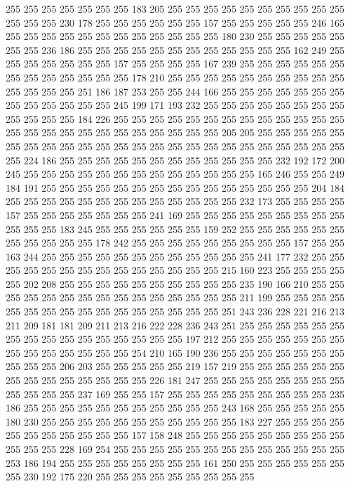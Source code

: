 255 255 255 255 255 255 255 183 205 255 255 255 255 255 255 255 255 255 255 255
255 255 230 178 255 255 255 255 255 255 157 255 255 255 255 255 246 165 255 255
255 255 255 255 255 255 255 255 255 255 180 230 255 255 255 255 255 255 255 236
186 255 255 255 255 255 255 255 255 255 255 255 255 162 249 255 255 255 255 255
255 255 157 255 255 255 255 167 239 255 255 255 255 255 255 255 255 255 255 255
255 255 178 210 255 255 255 255 255 255 255 255 255 255 255 255 255 255 251 186
187 253 255 255 244 166 255 255 255 255 255 255 255 255 255 255 255 255 255 245
199 171 193 232 255 255 255 255 255 255 255 255 255 255 255 255 184 226 255 255
255 255 255 255 255 255 255 255 255 255 255 255 255 255 255 255 255 255 255 255
255 255 255 205 205 255 255 255 255 255 255 255 255 255 255 255 255 255 255 255
255 255 255 255 255 255 255 255 255 255 224 186 255 255 255 255 255 255 255 255
255 255 255 255 232 192 172 200 245 255 255 255 255 255 255 255 255 255 255 255
255 255 165 246 255 255 249 184 191 255 255 255 255 255 255 255 255 255 255 255
255 255 255 255 204 184 255 255 255 255 255 255 255 255 255 255 255 255 255 232
173 255 255 255 255 157 255 255 255 255 255 255 255 241 169 255 255 255 255 255
255 255 255 255 255 255 255 183 245 255 255 255 255 255 255 159 252 255 255 255
255 255 255 255 255 255 255 255 178 242 255 255 255 255 255 255 255 255 255 157
255 255 163 244 255 255 255 255 255 255 255 255 255 255 255 255 241 177 232 255
255 255 255 255 255 255 255 255 255 255 255 255 255 215 160 223 255 255 255 255
255 202 208 255 255 255 255 255 255 255 255 255 255 235 190 166 210 255 255 255
255 255 255 255 255 255 255 255 255 255 255 255 211 199 255 255 255 255 255 255
255 255 255 255 255 255 255 255 255 255 251 243 236 228 221 216 213 211 209 181
181 209 211 213 216 222 228 236 243 251 255 255 255 255 255 255 255 255 255 255
255 255 255 255 255 255 197 212 255 255 255 255 255 255 255 255 255 255 255 255
255 255 254 210 165 190 236 255 255 255 255 255 255 255 255 255 255 206 203 255
255 255 255 255 219 157 219 255 255 255 255 255 255 255 255 255 255 255 255 255
255 226 181 247 255 255 255 255 255 255 255 255 255 255 255 255 237 169 255 255
157 255 255 255 255 255 255 255 255 255 235 186 255 255 255 255 255 255 255 255
255 255 255 243 168 255 255 255 255 255 180 230 255 255 255 255 255 255 255 255
255 255 255 183 227 255 255 255 255 255 255 255 255 255 255 255 157 158 248 255
255 255 255 255 255 255 255 255 255 255 255 228 169 254 255 255 255 255 255 255
255 255 255 255 255 255 255 253 186 194 255 255 255 255 255 255 255 255 161 250
255 255 255 255 255 255 255 230 192 175 220 255 255 255 255 255 255 255 255 255
